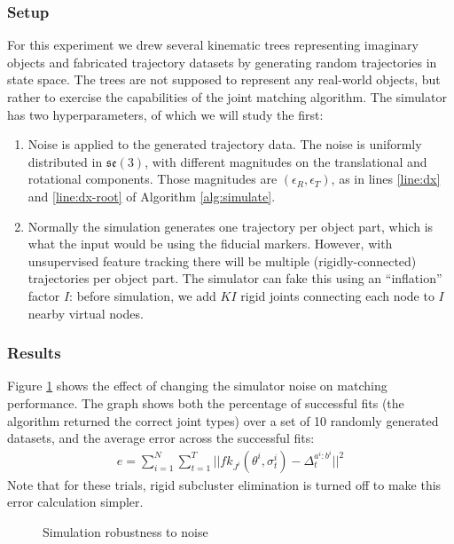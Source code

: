 \documentclass[letterpaper, 10 pt, conference]{ieeeconf}  %
\begin{document}
\subsubsection{Setup}
For this experiment we drew several kinematic trees representing imaginary objects and fabricated trajectory datasets by generating random trajectories in state space. The trees are not supposed to represent any real-world objects, but rather to exercise the capabilities of the joint matching algorithm. The simulator has two hyperparameters, of which we will study the first:
\begin{enumerate}
  \item Noise is applied to the generated trajectory data. The noise is uniformly distributed in $\mathfrak{se}(3)$, with different magnitudes on the translational and rotational components. Those magnitudes are $(\epsilon_R, \epsilon_T)$, as in lines \ref{line:dx} and \ref{line:dx-root} of Algorithm \ref{alg:simulate}.
  \item Normally the simulation generates one trajectory per object part, which is what the input would be using the fiducial markers. However, with unsupervised feature tracking there will be multiple (rigidly-connected) trajectories per object part. The simulator can fake this using an ``inflation'' factor $I$: before simulation, we add $KI$ rigid joints connecting each node to $I$ nearby virtual nodes.
\end{enumerate}

\subsubsection{Results}
Figure \ref{fig:exp1} shows the effect of changing the simulator noise on matching performance. The graph shows both the percentage of successful fits (the algorithm returned the correct joint types) over a set of 10 randomly generated datasets, and the average error across the successful fits:
\begin{align}
  e = \sum_{i=1}^N \sum_{t=1}^T || fk_{J^i}(\theta^i, \sigma^i_t) - \Delta^{a^i:b^i}_t ||^2
\end{align}
Note that for these trials, rigid subcluster elimination is turned off to make this error calculation simpler.

\begin{figure}[ht]
  \centering
  \caption{Simulation robustness to noise}
  \label{fig:exp1}
\end{figure}
\end{document}
